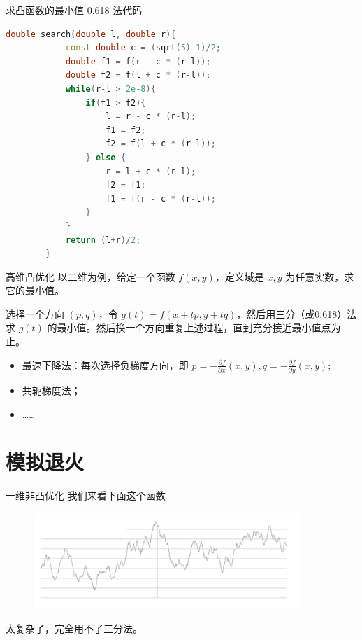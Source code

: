 \documentclass{beamer}
\begin{document}
\begin{frame}[fragile]{求凸函数的最小值}
    \small
    0.618 法代码
    \begin{lstlisting}[language=c++]
        double search(double l, double r){
            const double c = (sqrt(5)-1)/2;
            double f1 = f(r - c * (r-l));
            double f2 = f(l + c * (r-l));
            while(r-l > 2e-8){
                if(f1 > f2){
                    l = r - c * (r-l);
                    f1 = f2;
                    f2 = f(l + c * (r-l));
                } else {
                    r = l + c * (r-l);
                    f2 = f1;
                    f1 = f(r - c * (r-l));
                }
            }
            return (l+r)/2;
        }
    \end{lstlisting}
\end{frame}


\begin{frame}{高维凸优化}
    \small
    以二维为例，给定一个函数 $f(x,y)$，定义域是 $x,y$ 为任意实数，求它的最小值。

    \vspace{1em}
    \pause
    选择一个方向 $(p,q)$，令 $g(t)=f(x+tp, y+tq)$，然后用三分（或0.618）法求 $g(t)$
    的最小值。然后换一个方向重复上述过程，直到充分接近最小值点为止。
    \pause
    \begin{itemize}
        \item 最速下降法：每次选择负梯度方向，即 $p=-\frac{\partial f}{\partial x}(x,y), q=-\frac{\partial f}{\partial y}(x,y)$;
        \item 共轭梯度法；
        \item ……
    \end{itemize}
\end{frame}


\section{模拟退火}

\begin{frame}{一维非凸优化}
    \small
    我们来看下面这个函数

    \begin{figure}[H]
        \centering
        \includegraphics[width=0.9\textwidth]{pic/random.png}
    \end{figure}

    \pause
    太复杂了，完全用不了三分法。
\end{frame}
\end{document}
